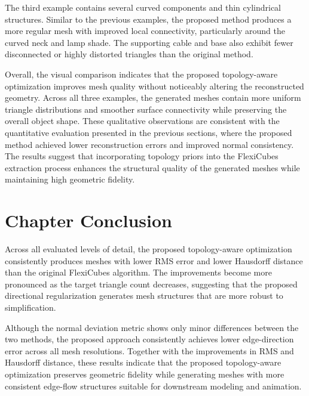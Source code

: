 \documentclass[../main.tex]{subfiles}
\begin{document}
The third example contains several curved components and thin cylindrical structures. Similar to the previous examples, the proposed method produces a more regular mesh with improved local connectivity, particularly around the curved neck and lamp shade. The supporting cable and base also exhibit fewer disconnected or highly distorted triangles than the original method.

Overall, the visual comparison indicates that the proposed topology-aware optimization improves mesh quality without noticeably altering the reconstructed geometry. Across all three examples, the generated meshes contain more uniform triangle distributions and smoother surface connectivity while preserving the overall object shape. These qualitative observations are consistent with the quantitative evaluation presented in the previous sections, where the proposed method achieved lower reconstruction errors and improved normal consistency. The results suggest that incorporating topology priors into the FlexiCubes extraction process enhances the structural quality of the generated meshes while maintaining high geometric fidelity.




\section{Chapter Conclusion}

Across all evaluated levels of detail, the proposed topology-aware optimization consistently produces meshes with lower RMS error and lower Hausdorff distance than the original FlexiCubes algorithm. The improvements become more pronounced as the target triangle count decreases, suggesting that the proposed directional regularization generates mesh structures that are more robust to simplification.

Although the normal deviation metric shows only minor differences between the two methods, the proposed approach consistently achieves lower edge-direction error across all mesh resolutions. Together with the improvements in RMS and Hausdorff distance, these results indicate that the proposed topology-aware optimization preserves geometric fidelity while generating meshes with more consistent edge-flow structures suitable for downstream modeling and animation.

	
\end{document}
